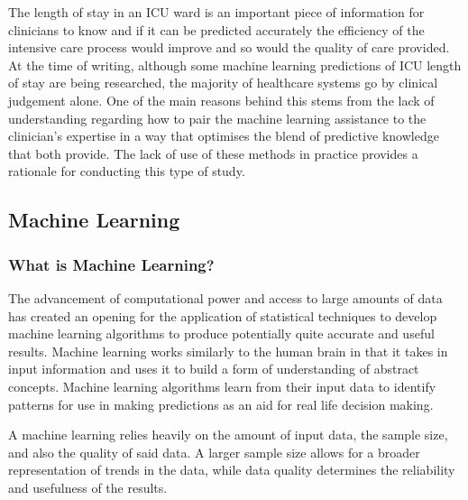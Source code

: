 \documentclass[11pt]{article}
\begin{document}
The length of stay in an ICU ward is an important piece of information for clinicians to know and if it can be predicted accurately the efficiency of the intensive care process would improve and so would the quality of care provided. At the time of writing, although some machine learning predictions of ICU length of stay are being researched\cite{Zhang2024}\cite{Yuan2025}\cite{Zhao2026}\cite{Nguyen2026}, the majority of healthcare systems go by clinical judgement alone\cite{Mak2012}. One of the main reasons behind this stems from the lack of understanding regarding how to pair the machine learning assistance to the clinician's expertise in a way that optimises the blend of predictive knowledge that both provide\cite{MachineLearningOpportunities}. The lack of use of these methods in practice provides a rationale for conducting this type of study.

\subsection{Machine Learning}

\subsubsection{What is Machine Learning?}

The advancement of computational power and access to large amounts of data has created an opening for the application of statistical techniques to develop machine learning algorithms to produce potentially quite accurate and useful results. Machine learning works similarly to the human brain in that it takes in input information and uses it to build a form of understanding of abstract concepts. Machine learning algorithms learn from their input data to identify patterns for use in making predictions as an aid for real life decision making.

A machine learning relies heavily on the amount of input data, the sample size, and also the quality of said data\cite{Chen2019}. A larger sample size allows for a broader representation of trends in the data, while data quality determines the reliability and usefulness of the results. 
\end{document}
